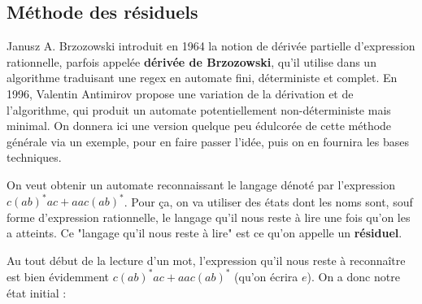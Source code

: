 \subsection{Méthode des résiduels}

Janusz A. Brzozowski introduit en 1964 la notion de dérivée partielle d'expression rationnelle, parfois appelée \textbf{dérivée de Brzozowski}, qu'il utilise dans un algorithme traduisant une regex en automate fini, déterministe et complet. En 1996, Valentin Antimirov propose une variation de la dérivation et de l'algorithme, qui produit un automate potentiellement non-déterministe mais minimal. On donnera ici une version quelque peu édulcorée de cette méthode générale via un exemple, pour en faire passer l'idée, puis on en fournira les bases techniques.


\begin{example}

On veut obtenir un automate reconnaissant le langage dénoté par l'expression $c(ab)^*ac + aac(ab)^*$. Pour ça, on va utiliser des états dont les noms sont, souf forme d'expression rationnelle, le langage qu'il nous reste à lire une fois qu'on les a atteints. Ce "langage qu'il nous reste à lire" est ce qu'on appelle un \textbf{résiduel}.

Au tout début de la lecture d'un mot, l'expression qu'il nous reste à reconnaître est bien évidemment $c(ab)^*ac + aac(ab)^*$ (qu'on écrira $e$). On a donc notre état initial :


\begin{figure}[H]
\centering

\end{figure}


\end{example}
